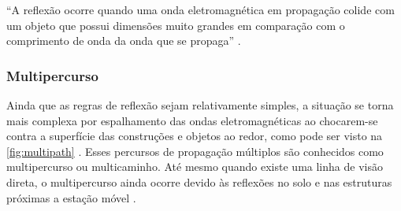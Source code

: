``A reflexão ocorre quando uma onda eletromagnética em propagação colide com um objeto que possui dimensões muito grandes em comparação com o comprimento de onda da onda que se propaga'' \cite[p.~76]{rappaport2009}.

\begin{figure}[H]
	\centering
\end{figure}

\subsubsection{Multipercurso}
\label{subsec:multipercurso}

Ainda que as regras de reflexão sejam relativamente simples, a situação se torna mais complexa por espalhamento das ondas eletromagnéticas ao chocarem-se contra a superfície das construções e objetos ao redor, como pode ser visto na \autoref{fig:multipath} \cite{haykin2008}.  Esses percursos de propagação múltiplos são conhecidos como multipercurso ou multicaminho. Até mesmo quando existe uma linha de visão direta, o multipercurso ainda ocorre devido às reflexões no solo e nas estruturas próximas a estação móvel \cite{rappaport2009}.

\begin{figure}[H]
	\centering
\end{figure}

